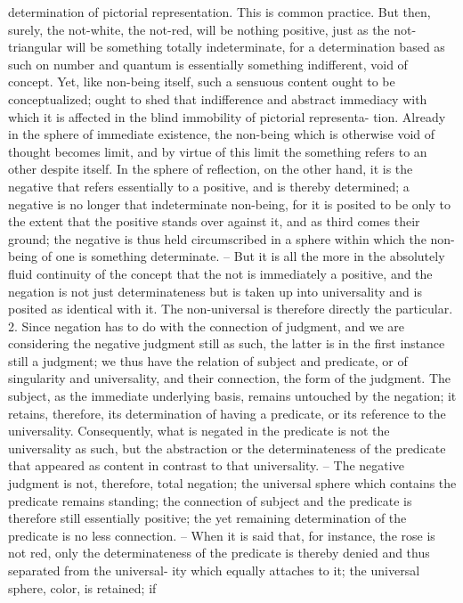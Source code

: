 determination of pictorial representation. This is common practice. But
then, surely, the not-white, the not-red, will be nothing positive, just as the
not-triangular will be something totally indeterminate, for a determination
based as such on number and quantum is essentially something indifferent,
void of concept. Yet, like non-being itself, such a sensuous content ought to
be conceptualized; ought to shed that indifference and abstract immediacy
with which it is affected in the blind immobility of pictorial representa-
tion. Already in the sphere of immediate existence, the non-being which is
otherwise void of thought becomes limit, and by virtue of this limit the
something refers to an other despite itself. In the sphere of reflection, on the
other hand, it is the negative that refers essentially to a positive, and is thereby
determined; a negative is no longer that indeterminate non-being, for it is
posited to be only to the extent that the positive stands over against it, and
as third comes their ground; the negative is thus held circumscribed in a
sphere within which the non-being of one is something determinate. – But
it is all the more in the absolutely fluid continuity of the concept that the
not is immediately a positive, and the negation is not just determinateness
but is taken up into universality and is posited as identical with it. The
non-universal is therefore directly the particular.
2. Since negation has to do with the connection of judgment, and we are
considering the negative judgment still as such, the latter is in the first instance
still a judgment; we thus have the relation of subject and predicate, or of
singularity and universality, and their connection, the form of the judgment.
The subject, as the immediate underlying basis, remains untouched by the
negation; it retains, therefore, its determination of having a predicate, or its
reference to the universality. Consequently, what is negated in the predicate
is not the universality as such, but the abstraction or the determinateness
of the predicate that appeared as content in contrast to that universality. –
The negative judgment is not, therefore, total negation; the universal
sphere which contains the predicate remains standing; the connection
of subject and the predicate is therefore still essentially positive; the yet
remaining determination of the predicate is no less connection. – When
it is said that, for instance, the rose is not red, only the determinateness
of the predicate is thereby denied and thus separated from the universal-
ity which equally attaches to it; the universal sphere, color, is retained; if
